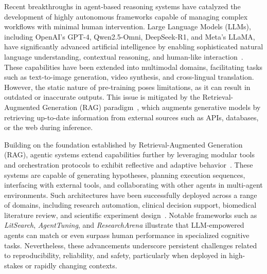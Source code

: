 \vspace{0.5cm}

Recent breakthroughs in agent-based reasoning systems have catalyzed the development of highly autonomous frameworks capable of managing complex workflows with minimal human intervention. Large Language Models (LLMs), including OpenAI’s GPT-4, Qwen2.5-Omni, DeepSeek-R1, and Meta’s LLaMA, have significantly advanced artificial intelligence by enabling sophisticated natural language understanding, contextual reasoning, and human-like interaction~\cite{openai2023gpt4, qwen2024omni, deepseek2024r1, touvron2023llama2}. These capabilities have been extended into multimodal domains, facilitating tasks such as text-to-image generation, video synthesis, and cross-lingual translation. However, the static nature of pre-training poses limitations, as it can result in outdated or inaccurate outputs. This issue is mitigated by the Retrieval-Augmented Generation (RAG) paradigm~\cite{lewis2020retrieval}, which augments generative models by retrieving up-to-date information from external sources such as APIs, databases, or the web during inference.

\vspace{0.5cm}

Building on the foundation established by Retrieval-Augmented Generation (RAG), agentic systems extend capabilities further by leveraging modular tools and orchestration protocols to exhibit reflective and adaptive behavior~\cite{ferrag2025can, wu2024agenttuning}. These systems are capable of generating hypotheses, planning execution sequences, interfacing with external tools, and collaborating with other agents in multi-agent environments. Such architectures have been successfully deployed across a range of domains, including research automation, clinical decision support, biomedical literature review, and scientific experiment design~\cite{litsearch2024, researcharena2025}. Notable frameworks such as \textit{LitSearch}, \textit{AgentTuning}, and \textit{ResearchArena} illustrate that LLM-empowered agents can match or even surpass human performance in specialized cognitive tasks. Nevertheless, these advancements underscore persistent challenges related to reproducibility, reliability, and safety, particularly when deployed in high-stakes or rapidly changing contexts.

\vspace{0.5cm}

